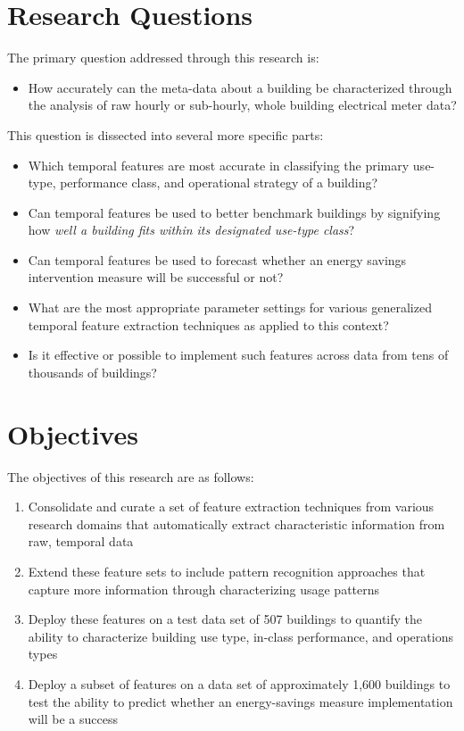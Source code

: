 \section{Research Questions}
The primary question addressed through this research is:
\begin{itemize}
\item How accurately can the meta-data about a building be characterized through the analysis of raw hourly or sub-hourly, whole building electrical meter data? 
\end{itemize}

This question is dissected into several more specific parts:
\begin{itemize}
\item Which temporal features are most accurate in classifying the primary use-type, performance class, and operational strategy of a building?
\item Can temporal features be used to better benchmark buildings by signifying how \emph{well a building fits within its designated use-type class}?
\item Can temporal features be used to forecast whether an energy savings intervention measure will be successful or not?
\item What are the most appropriate parameter settings for various generalized temporal feature extraction techniques as applied to this context?
\item Is it effective or possible to implement such features across data from tens of thousands of buildings?
\end{itemize}

\section{Objectives}
The objectives of this research are as follows:
\begin{enumerate}
\item Consolidate and curate a set of feature extraction techniques from various research domains that automatically extract characteristic information from raw, temporal data
\item Extend these feature sets to include pattern recognition approaches that capture more information through characterizing usage patterns
\item Deploy these features on a test data set of 507 buildings to quantify the ability to characterize building use type, in-class performance, and operations types
\item Deploy a subset of features on a data set of approximately 1,600 buildings to test the ability to predict whether an energy-savings measure implementation will be a success 
\end{enumerate}

